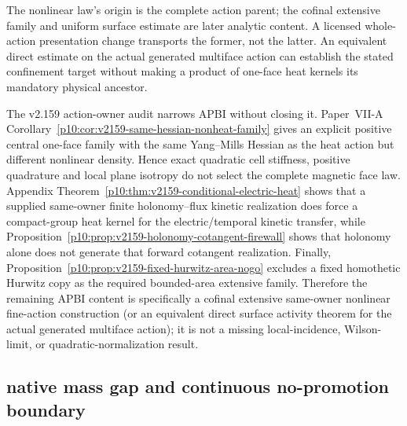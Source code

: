 \documentclass[12pt,a4paper]{article}
\begin{document}
\begin{remark}
\label{p12:rem:v2159-apbi-action-owner-residue}
The nonlinear law's origin is the complete action parent; the cofinal
extensive family and uniform surface estimate are later analytic content.
A licensed whole-action presentation change transports the former, not the
latter.  An equivalent direct estimate on the actual generated multiface
action can establish the stated confinement target without making a product
of one-face heat kernels its mandatory physical ancestor.

The v2.159 action-owner audit narrows APBI without closing it.  Paper~VII-A
Corollary~\ref{p10:cor:v2159-same-hessian-nonheat-family} gives an explicit
positive central one-face family with the same Yang--Mills Hessian as the heat
action but different nonlinear density.  Hence exact quadratic cell stiffness,
positive quadrature and local plane isotropy do not select the complete
magnetic face law.  Appendix
Theorem~\ref{p10:thm:v2159-conditional-electric-heat} shows that a supplied
same-owner finite holonomy--flux kinetic realization does force a compact-group
heat kernel for the electric/temporal kinetic transfer, while
Proposition~\ref{p10:prop:v2159-holonomy-cotangent-firewall} shows that
holonomy alone does not generate that forward cotangent realization.  Finally,
Proposition~\ref{p10:prop:v2159-fixed-hurwitz-area-nogo} excludes a fixed
homothetic Hurwitz copy as the required bounded-area extensive family.
Therefore the remaining APBI content is specifically a cofinal extensive
same-owner nonlinear fine-action construction (or an equivalent direct surface
activity theorem for the actual generated multiface action); it is not a
missing local-incidence, Wilson-limit, or quadratic-normalization result.
\end{remark}


\subsection{native mass gap and continuous no-promotion boundary}
\label{p12:sec:v165-native-gap-continuum-boundary}
\end{document}
